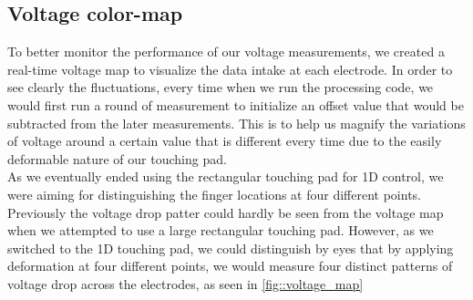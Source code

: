 \documentclass[reprint,amsmath, amsfonts, amssymb, aps, letterpaper]{revtex4-1}
\begin{document}
\subsection{Voltage color-map}
To better monitor the performance of our voltage measurements, we created a real-time voltage map to visualize the data intake at each electrode. In order to see clearly the fluctuations, every time when we run the processing code, we would first run a round of measurement to initialize an offset value that would be subtracted from the later measurements. This is to help us magnify the variations of voltage around a certain value that is different every time due to the easily deformable nature of our touching pad.
\\\indent As we eventually ended using the rectangular touching pad for 1D control, we were aiming for distinguishing the finger locations at four different points. Previously the voltage drop patter could hardly be seen from the voltage map when we attempted to use a large rectangular touching pad. However, as we switched to the 1D touching pad, we could distinguish by eyes that by applying deformation at four different points, we would measure four distinct patterns of voltage drop across the electrodes, as seen in \ref{fig::voltage_map}
\end{document}
